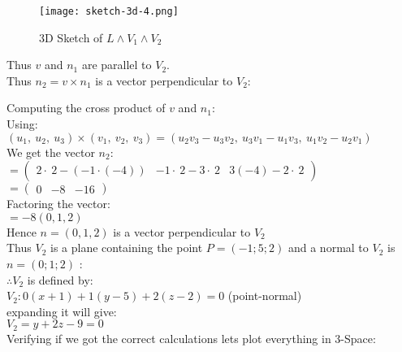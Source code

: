 \begin{figure}[H]
\centering
\texttt{[image: sketch-3d-4.png]}
\caption{3D Sketch of $L \land V_1 \land V_2$}
\label{fig:Plane_3D_worked_4}
\end{figure}

Thus $v$ and $n_1$ are parallel to $V_2$. \\

Thus $n_2 = v \times n_1$ is a vector perpendicular to $V_2$:

Computing the cross product of $v$ and $n_1$: \\ 

Using: \\

$\left(u_1,\:u_2,\:u_3\right)\times \left(v_1,\:v_2,\:v_3\right)=\left(u_2v_3-u_3v_2,\:u_3v_1-u_1v_3,\:u_1v_2-u_2v_1\right)$ \\

We get the vector $n_2$: \\

$= \begin{pmatrix}2\cdot \:2-\left(-1\cdot \left(-4\right)\right)&-1\cdot \:2-3\cdot \:2&3\left(-4\right)-2\cdot \:2\end{pmatrix}$ \\


$= \begin{pmatrix}0&-8&-16\end{pmatrix}$ \\

Factoring the vector: \\

$= -8(0,1,2)$ \\

Hence $n = (0,1,2)$ is a vector perpendicular to $V_2$ \\

Thus $V_2$ is a plane containing the point $P = (-1; 5; 2)$ and a normal to $V_2$ is $n = (0; 1; 2)$ : \\

$\therefore V_2$ is defined by: \\

$V_2: 0(x + 1) + 1 (y - 5) + 2 (z - 2) = 0$ (point-normal) \\

expanding it will give: \\

$V_2 = y+2z-9=0$ \\

Verifying if we got the correct calculations lets plot everything in 3-Space:

